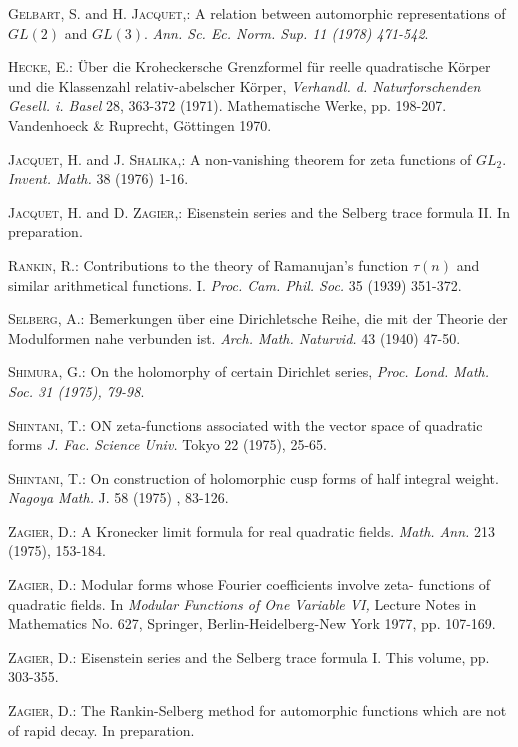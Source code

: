 \begin{thebibliography}{99}
 \textsc{Gelbart, S.} and \textsc{H. Jacquet,:} A relation between automorphic representations of $GL(2)$ and $GL(3)$. \textit{Ann. Sc. Ec. Norm. Sup. 11 (1978) 471-542}.

 \textsc{Hecke, E.:} \"Uber die Kroheckersche Grenzformel f\"ur reelle quadratische K\"orper und die Klassenzahl relativ-abelscher K\"orper, \textit{Verhandl. d. Naturforschenden Gesell. i. Basel} 28, 363-372 (1971). Mathematische Werke, pp. 198-207. Vandenhoeck \& Ruprecht, G\"ottingen 1970.

 \textsc{Jacquet, H.} and \textsc{J. Shalika},: A non-vanishing theorem for zeta functions of $GL_2$. \textit{Invent. Math.} 38 (1976) 1-16.

 \textsc{Jacquet, H.} and \textsc{D. Zagier,:} Eisenstein series and the Selberg trace formula II. In preparation. 

 \textsc{Rankin, R.:} Contributions to the theory of Ramanujan's function $\tau(n)$ and similar arithmetical functions. I. \textit{Proc. Cam. Phil. Soc.} 35 (1939) 351-372.

 \textsc{Selberg, A.:} Bemerkungen \"uber eine Dirichletsche Reihe, die mit der Theorie der Modulformen nahe verbunden ist. \textit{Arch. Math. Naturvid.} 43 (1940) 47-50.

 \textsc{Shimura, G.:} On the holomorphy of certain Dirichlet series, \textit{Proc. Lond. Math. Soc. 31 (1975), 79-98}.

 \textsc{Shintani, T.:} ON zeta-functions associated with the vector space of quadratic forms \textit{J. Fac. Science Univ.} Tokyo 22 (1975), 25-65.

 \textsc{Shintani, T.:} On construction of holomorphic cusp forms of half integral weight. \textit{Nagoya Math.} J. 58 (1975) , 83-126.

 \textsc{Zagier, D.:} A Kronecker limit formula for real quadratic fields. \textit{Math. Ann.} 213 (1975), 153-184.

 \textsc{Zagier, D.:} Modular forms whose Fourier coefficients involve zeta- functions  of quadratic fields. In \textit{Modular Functions of One Variable VI,} Lecture Notes in Mathematics No. 627, Springer, Berlin-Heidelberg-New York 1977, pp. 107-169.

 \textsc{Zagier, D.:} Eisenstein series and the Selberg trace formula I. This volume, pp. 303-355.

 \textsc{Zagier, D.:} The Rankin-Selberg method for automorphic functions which are not of rapid decay. In preparation.
\end{thebibliography}










